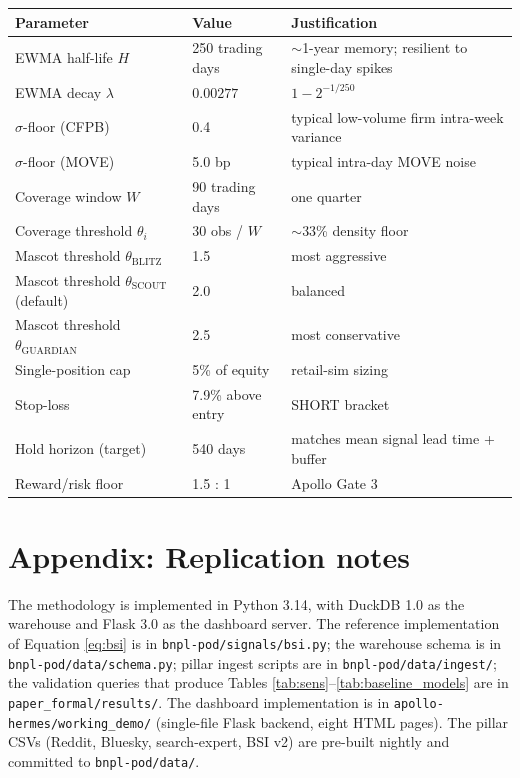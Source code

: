 \documentclass[11pt,a4paper]{article}
\begin{document}
\begin{table}[h]
\centering\small
\begin{tabular}{@{}p{4.5cm}p{2.5cm}p{6cm}@{}}
\toprule
\textbf{Parameter} & \textbf{Value} & \textbf{Justification} \\
\midrule
EWMA half-life $H$ & 250 trading days & $\sim$1-year memory; resilient to single-day spikes \\
EWMA decay $\lambda$ & $0.00277$ & $1 - 2^{-1/250}$ \\
$\sigma$-floor (CFPB) & 0.4 & typical low-volume firm intra-week variance \\
$\sigma$-floor (MOVE) & 5.0 bp & typical intra-day MOVE noise \\
Coverage window $W$ & 90 trading days & one quarter \\
Coverage threshold $\theta_i$ & 30 obs / $W$ & $\sim$33\% density floor \\
Mascot threshold $\theta_{\text{BLITZ}}$ & 1.5 & most aggressive \\
Mascot threshold $\theta_{\text{SCOUT}}$ (default) & 2.0 & balanced \\
Mascot threshold $\theta_{\text{GUARDIAN}}$ & 2.5 & most conservative \\
Single-position cap & 5\% of equity & retail-sim sizing \\
Stop-loss & 7.9\% above entry & SHORT bracket \\
Hold horizon (target) & 540 days & matches mean signal lead time + buffer \\
Reward/risk floor & 1.5 : 1 & Apollo Gate 3 \\
\bottomrule
\end{tabular}
\end{table}

\section{Appendix: Replication notes}

{\sloppy The methodology is implemented in Python 3.14, with DuckDB 1.0 as the warehouse and Flask 3.0 as the dashboard server. The reference implementation of Equation \ref{eq:bsi} is in \texttt{bnpl-pod/signals/bsi.py}; the warehouse schema is in \texttt{bnpl-pod/data/schema.py}; pillar ingest scripts are in \texttt{bnpl-pod/data/ingest/}; the validation queries that produce Tables \ref{tab:sens}--\ref{tab:baseline_models} are in \texttt{paper\_formal/results/}. The dashboard implementation is in \texttt{apollo-hermes/working\_demo/} (single-file Flask backend, eight HTML pages). The pillar CSVs (Reddit, Bluesky, search-expert, BSI v2) are pre-built nightly and committed to \texttt{bnpl-pod/data/}.}
\end{document}
